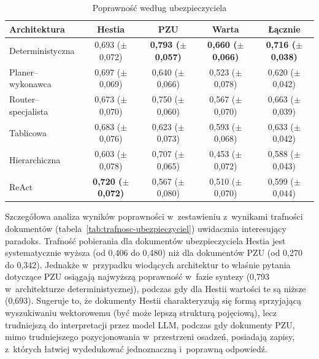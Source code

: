   \begin{table}[H]
    \caption{Poprawność według ubezpieczyciela}\label{tab:poprawnosc-ubezpieczyciel}
    \centering
    \small
    \renewcommand{\arraystretch}{1.3}
    \begin{tabular}{@{} l c c c c @{}}
      \toprule
      \textbf{Architektura}
      & \textbf{Hestia}
      & \textbf{PZU}
      & \textbf{Warta}
      & \textbf{Łącznie}                                                                                                                              \\
      \midrule
      Deterministyczna    & 0{,}693 (\(\pm\) 0{,}072)          & \textbf{0{,}793 (\(\pm\) 0{,}057)} & \textbf{0{,}660 (\(\pm\) 0{,}066)} & \textbf{0{,}716 (\(\pm\) 0{,}038)} \\
      Planer--wykonawca   & 0{,}697 (\(\pm\) 0{,}069)          & 0{,}640 (\(\pm\) 0{,}066)          & 0{,}523 (\(\pm\) 0{,}078)          & 0{,}620 (\(\pm\) 0{,}042)          \\
      Router--specjalista & 0{,}673 (\(\pm\) 0{,}070)          & 0{,}750 (\(\pm\) 0{,}060)          & 0{,}567 (\(\pm\) 0{,}070)          & 0{,}663 (\(\pm\) 0{,}039)          \\
      Tablicowa           & 0{,}683 (\(\pm\) 0{,}076)          & 0{,}623 (\(\pm\) 0{,}073)          & 0{,}593 (\(\pm\) 0{,}068)          & 0{,}633 (\(\pm\) 0{,}042)          \\
      Hierarchiczna       & 0{,}603 (\(\pm\) 0{,}078)          & 0{,}707 (\(\pm\) 0{,}065)          & 0{,}453 (\(\pm\) 0{,}072)          & 0{,}588 (\(\pm\) 0{,}043)          \\
      ReAct               & \textbf{0{,}720 (\(\pm\) 0{,}072)} & 0{,}567 (\(\pm\) 0{,}080)          & 0{,}510 (\(\pm\) 0{,}070)          & 0{,}599 (\(\pm\) 0{,}044)          \\
      \bottomrule
    \end{tabular}
  \end{table}

  Szczegółowa analiza wyników poprawności w~zestawieniu z~wynikami trafności
  dokumentów (tabela~\ref{tab:trafnosc-ubezpieczyciel}) uwidacznia interesujący
  paradoks. Trafność pobierania dla dokumentów ubezpieczyciela Hestia jest
  systematycznie wyższa (od 0{,}406 do 0{,}480) niż dla dokumentów PZU
  (od 0{,}270 do 0{,}342). Jednakże w~przypadku wiodących architektur to właśnie
  pytania dotyczące PZU osiągają najwyższą poprawność w~fazie syntezy (0{,}793
  w~architekturze deterministycznej), podczas gdy dla Hestii wartości te są
  niższe (0{,}693). Sugeruje to, że dokumenty Hestii charakteryzują się formą
  sprzyjającą wyszukiwaniu wektorowemu (być może lepszą strukturą pojęciową),
  lecz trudniejszą do interpretacji przez model LLM, podczas gdy dokumenty PZU,
  mimo trudniejszego pozycjonowania w~przestrzeni osadzeń, posiadają zapisy,
  z~których łatwiej wydedukować jednoznaczną i~poprawną odpowiedź.

